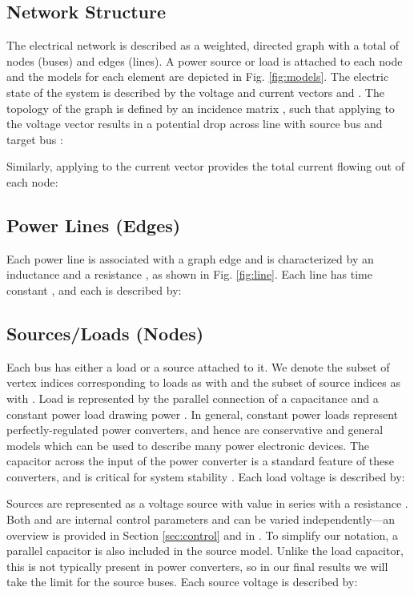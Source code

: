 \documentclass[letterpaper, 10 pt, conference]{ieeeconf}
\begin{document}
\subsection{Network Structure}

The electrical network is described as a weighted, directed graph  with a total of   nodes (buses) and  edges (lines). A power source or load is attached to each node and the models for each element are depicted in Fig. \ref{fig:models}. The electric state of the system is described by the voltage and current vectors  and . The topology of the graph is defined by an incidence matrix , such that applying  to the voltage vector results in a potential drop across line  with source bus  and target bus :


\noindent Similarly, applying  to the current vector provides the total current flowing out of each node:




\subsection{Power Lines (Edges)}

Each power line is associated with a graph edge  and is characterized by an inductance  and a resistance , as shown in Fig. \ref{fig:line}. Each line has time constant , and each  is described by:



\subsection{Sources/Loads (Nodes)}

Each bus has either a load or a source attached to it. We denote the subset of vertex indices corresponding to loads as  with  and the subset of source indices as  with . Load  is represented by the parallel connection of a capacitance  and a constant power load drawing power . In general, constant power loads represent perfectly-regulated power converters, and hence are conservative and general models which can be used to describe many power electronic devices. The capacitor across the input of the power converter is a standard feature of these converters, and is critical for system stability \cite{Cezar:2015io}. Each load voltage is described by:



Sources are represented as a voltage source with value  in series with a resistance . Both  and  are internal control parameters and can be varied independently---an overview is provided in Section \ref{sec:control} and in \cite{GuerreroHierarchy,GuerreroDroop}. To simplify our notation, a parallel capacitor is also included in the source model. Unlike the load capacitor, this is not typically present in power converters, so in our final results we will take the limit  for the source buses. Each source voltage is described by:
\end{document}
